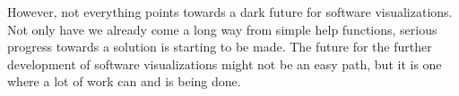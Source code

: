 \documentclass[11pt, a4paper, ngerman, twoside]{article}
\theoremstyle{plain}\newtheorem{Lemma}{Lemma}
\theoremstyle{plain}\newtheorem{Satz}[Lemma]{Satz}
\theoremstyle{definition}\newtheorem{Definition}[Lemma]{Definition}
\theoremstyle{definition}\newtheorem*{Beispiel}{Beispiel}
\theoremstyle{remark}\newtheorem*{Bemerkung}{Bemerkung}
\begin{document}
However, not everything points towards a dark future for software visualizations. Not only have we already come a long way from simple help functions, serious progress towards a solution is starting to be made. The future for the further development of software visualizations might not be an easy path, but it is one where a lot of work can and is being done.



\end{document}
